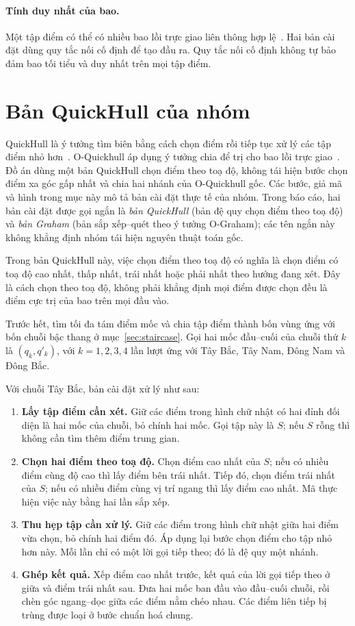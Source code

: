 \paragraph{Tính duy nhất của bao.}
Một tập điểm có thể có nhiều bao lồi trực giao liên thông hợp lệ~\cite{an2021ograham,nguyen2022quickhull}. Hai bản cài đặt dùng quy tắc nối cố định để tạo đầu ra. Quy tắc nối cố định không tự bảo đảm bao tối tiểu và duy nhất trên mọi tập điểm.

\section{Bản QuickHull của nhóm}
\label{sec:quickhull}

QuickHull là ý tưởng tìm biên bằng cách chọn điểm rồi tiếp tục xử lý các tập điểm nhỏ hơn~\cite{eddy1977,barber1996}. O-Quickhull áp dụng ý tưởng chia để trị cho bao lồi trực giao~\cite{nguyen2022quickhull}. Đồ án dùng một bản QuickHull chọn điểm theo toạ độ, không tái hiện bước chọn điểm xa góc gấp nhất và chia hai nhánh của O-Quickhull gốc. Các bước, giả mã và hình trong mục này mô tả bản cài đặt thực tế của nhóm. Trong báo cáo, hai bản cài đặt được gọi ngắn là \emph{bản QuickHull} (bản đệ quy chọn điểm theo toạ độ) và \emph{bản Graham} (bản sắp xếp--quét theo ý tưởng O-Graham); các tên ngắn này không khẳng định nhóm tái hiện nguyên thuật toán gốc.

Trong bản QuickHull này, việc chọn điểm theo toạ độ có nghĩa là chọn điểm có toạ độ cao nhất, thấp nhất, trái nhất hoặc phải nhất theo hướng đang xét. Đây là cách chọn theo toạ độ, không phải khẳng định mọi điểm được chọn đều là điểm cực trị của bao trên mọi đầu vào.

Trước hết, tìm tối đa tám điểm mốc và chia tập điểm thành bốn vùng ứng với bốn chuỗi bậc thang ở mục~\ref{sec:staircase}. Gọi hai mốc đầu--cuối của chuỗi thứ $k$ là $(q_k,q'_k)$, với $k=1,2,3,4$ lần lượt ứng với Tây Bắc, Tây Nam, Đông Nam và Đông Bắc.

Với chuỗi Tây Bắc, bản cài đặt xử lý như sau:
\begin{enumerate}
  \item \textbf{Lấy tập điểm cần xét.} Giữ các điểm trong hình chữ nhật có hai đỉnh đối diện là hai mốc của chuỗi, bỏ chính hai mốc. Gọi tập này là $S$; nếu $S$ rỗng thì không cần tìm thêm điểm trung gian.
  \item \textbf{Chọn hai điểm theo toạ độ.} Chọn điểm cao nhất của $S$; nếu có nhiều điểm cùng độ cao thì lấy điểm bên trái nhất. Tiếp đó, chọn điểm trái nhất của $S$; nếu có nhiều điểm cùng vị trí ngang thì lấy điểm cao nhất. Mã thực hiện việc này bằng hai lần sắp xếp.
  \item \textbf{Thu hẹp tập cần xử lý.} Giữ các điểm trong hình chữ nhật giữa hai điểm vừa chọn, bỏ chính hai điểm đó. Áp dụng lại bước chọn điểm cho tập nhỏ hơn này. Mỗi lần chỉ có một lời gọi tiếp theo; đó là đệ quy một nhánh.
  \item \textbf{Ghép kết quả.} Xếp điểm cao nhất trước, kết quả của lời gọi tiếp theo ở giữa và điểm trái nhất sau. Đưa hai mốc ban đầu vào đầu--cuối chuỗi, rồi chèn góc ngang--dọc giữa các điểm nằm chéo nhau. Các điểm liên tiếp bị trùng được loại ở bước chuẩn hoá chung.
\end{enumerate}

